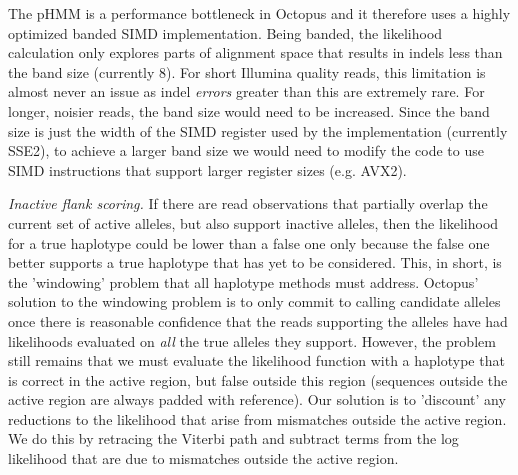 \documentclass[notitlepage, twocolumn, 10pt]{article}
\begin{document}
The pHMM is a performance bottleneck in Octopus and it therefore uses a highly optimized banded SIMD implementation. Being banded, the likelihood calculation only explores parts of alignment space that results in indels less than the band size (currently 8). For short Illumina quality reads, this limitation is almost never an issue as indel \emph{errors} greater than this are extremely rare. For longer, noisier reads, the band size would need to be increased. Since the band size is just the width of the SIMD register used by the implementation (currently SSE2), to achieve a larger band size we would need to modify the code to use SIMD instructions that support larger register sizes (e.g. AVX2).

\vspace{3mm}
\noindent\emph{Inactive flank scoring.} If there are read observations that partially overlap the current set of active alleles, but also support inactive alleles, then the likelihood for a true haplotype could be lower than a false one only because the false one better supports a true haplotype that has yet to be considered. This, in short, is the 'windowing' problem that all haplotype methods must address. Octopus' solution to the windowing problem is to only commit to calling candidate alleles once there is reasonable confidence that the reads supporting the alleles have had likelihoods evaluated on \emph{all} the true alleles they support. However, the problem still remains that we must evaluate the likelihood function with a haplotype that is correct in the active region, but false outside this region (sequences outside the active region are always padded with reference). Our solution is to 'discount' any reductions to the likelihood that arise from mismatches outside the active region. We do this by retracing the Viterbi path and subtract terms from the log likelihood that are due to mismatches outside the active region.
\end{document}
